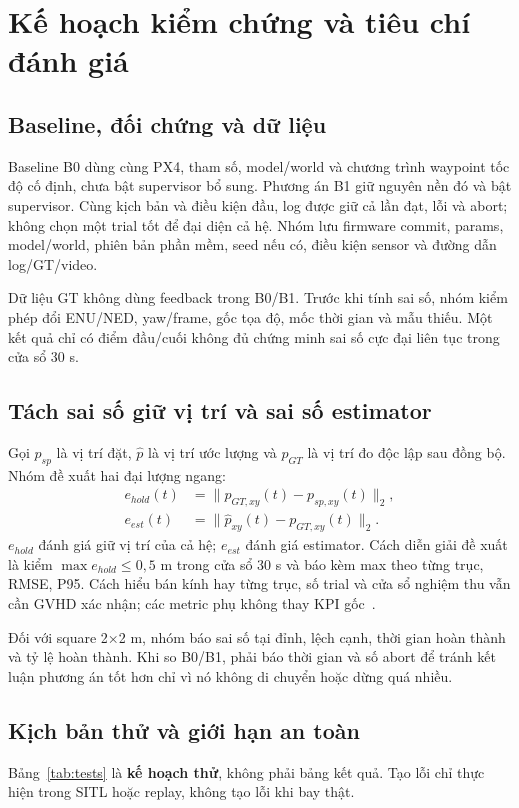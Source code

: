 \documentclass[a4paper,12pt]{article}
\begin{document}
\section{Kế hoạch kiểm chứng và tiêu chí đánh giá}
\subsection{Baseline, đối chứng và dữ liệu}
Baseline B0 dùng cùng PX4, tham số, model/world và chương trình waypoint tốc độ cố định, chưa bật supervisor bổ sung. Phương án B1 giữ nguyên nền đó và bật supervisor. Cùng kịch bản và điều kiện đầu, log được giữ cả lần đạt, lỗi và abort; không chọn một trial tốt để đại diện cả hệ. Nhóm lưu firmware commit, params, model/world, phiên bản phần mềm, seed nếu có, điều kiện sensor và đường dẫn log/GT/video.

Dữ liệu GT không dùng feedback trong B0/B1. Trước khi tính sai số, nhóm kiểm phép đổi ENU/NED, yaw/frame, gốc tọa độ, mốc thời gian và mẫu thiếu. Một kết quả chỉ có điểm đầu/cuối không đủ chứng minh sai số cực đại liên tục trong cửa sổ 30 s.

\subsection{Tách sai số giữ vị trí và sai số estimator}
Gọi $p_{sp}$ là vị trí đặt, $\hat p$ là vị trí ước lượng và $p_{GT}$ là vị trí đo độc lập sau đồng bộ. Nhóm đề xuất hai đại lượng ngang:
\begin{align}
e_{hold}(t)&=\|p_{GT,xy}(t)-p_{sp,xy}(t)\|_2,\\
e_{est}(t)&=\|\hat p_{xy}(t)-p_{GT,xy}(t)\|_2.
\end{align}
$e_{hold}$ đánh giá giữ vị trí của cả hệ; $e_{est}$ đánh giá estimator. Cách diễn giải đề xuất là kiểm $\max e_{hold}\leq0{,}5$ m trong cửa sổ 30 s và báo kèm max theo từng trục, RMSE, P95. Cách hiểu bán kính hay từng trục, số trial và cửa sổ nghiệm thu vẫn cần GVHD xác nhận; các metric phụ không thay KPI gốc~\cite{source1}.

Đối với square 2×2 m, nhóm báo sai số tại đỉnh, lệch cạnh, thời gian hoàn thành và tỷ lệ hoàn thành. Khi so B0/B1, phải báo thời gian và số abort để tránh kết luận phương án tốt hơn chỉ vì nó không di chuyển hoặc dừng quá nhiều.

\subsection{Kịch bản thử và giới hạn an toàn}
Bảng~\ref{tab:tests} là \textbf{kế hoạch thử}, không phải bảng kết quả. Tạo lỗi chỉ thực hiện trong SITL hoặc replay, không tạo lỗi khi bay thật.
\end{document}
